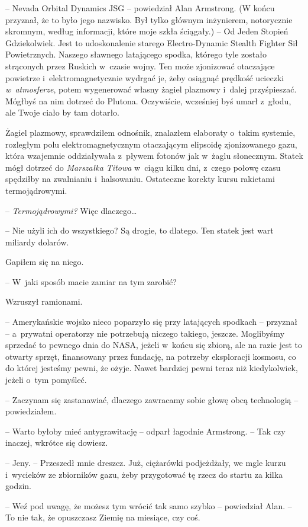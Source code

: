 \documentclass[oneside,polish,12pt,sfheadings]{mwbk}
\begin{document}
-- Nevada Orbital Dynamics JSG -- powiedział Alan Armstrong. (W końcu
przyznał, że to było jego nazwisko. Był tylko głównym inżynierem,
notorycznie skromnym, według informacji, które moje szkła ściągały.) --
Od Jeden Stopień Gdziekolwiek. Jest to udoskonalenie starego
Electro-Dynamic Stealth Fighter Sił Powietrznych. Naszego sławnego
latającego spodka, którego tyle zostało strąconych przez Ruskich w~czasie wojny. Ten może zjonizować otaczające powietrze i~elektromagnetycznie wydrgać je, żeby osiągnąć prędkość ucieczki \emph{w~atmosferze}, potem wygenerować własny żagiel plazmowy i~dalej
przyśpieszać. Mógłbyś na nim dotrzeć do Plutona. Oczywiście, wcześniej
byś umarł z~głodu, ale Twoje ciało by tam dotarło.

Żagiel plazmowy, sprawdziłem odnośnik, znalazłem elaboraty o~takim
systemie, rozległym polu elektromagnetycznym otaczającym elipsoidę
zjonizowanego gazu, która wzajemnie oddziaływała z~pływem fotonów jak w~żaglu słonecznym. Statek mógł dotrzeć do \emph{Marszałka Titowa} w~ciągu
kilku dni, z~czego połowę czasu spędziłby na zwalnianiu i~halsowaniu.
Ostateczne korekty kursu rakietami termojądrowymi.

-- \emph{Termojądrowymi? } Więc dlaczego\ldots

-- Nie użyli ich do wszystkiego? Są drogie, to dlatego. Ten statek jest
wart miliardy dolarów.

Gapiłem się na niego. 

-- W~jaki sposób macie zamiar na tym zarobić?

Wzruszył ramionami. 

-- Amerykańskie wojsko nieco poparzyło się przy
latających spodkach -- przyznał -- a~prywatni operatorzy nie potrzebują
niczego takiego, jeszcze. Moglibyśmy sprzedać to pewnego dnia do NASA,
jeżeli w~końcu się zbiorą, ale na razie jest to otwarty sprzęt,
finansowany przez fundację, na potrzeby eksploracji kosmosu, co do
której jesteśmy pewni, że ożyje. Nawet bardziej pewni teraz niż
kiedykolwiek, jeżeli o~tym pomyśleć.

-- Zaczynam się zastanawiać, dlaczego zawracamy sobie głowę obcą
technologią -- powiedziałem.

-- Warto byłoby mieć antygrawitację -- odparł łagodnie Armstrong. -- Tak
czy inaczej, wkrótce się dowiesz.

-- Jeny. -- Przeszedł mnie dreszcz. Już, ciężarówki podjeżdżały, we mgle
kurzu i~wycieków ze zbiorników gazu, żeby przygotować tę rzecz do startu
za kilka godzin.

-- Weź pod uwagę, że możesz tym wrócić tak samo szybko -- powiedział Alan.
-- To nie tak, że opuszczasz Ziemię na miesiące, czy coś.
\end{document}
